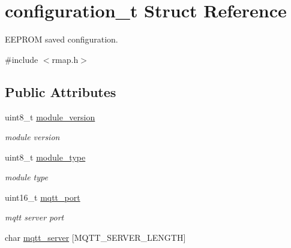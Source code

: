\hypertarget{structconfiguration__t}{}\section{configuration\+\_\+t Struct Reference}
\label{structconfiguration__t}


E\+E\+P\+R\+OM saved configuration.  




{\ttfamily \#include $<$rmap.\+h$>$}

\subsection*{Public Attributes}
\begin{DoxyCompactItemize}
\item 
\mbox{\label{structconfiguration__t_a32d4c4bb78b5b231704c8a9f8d1b9e87}} 
uint8\+\_\+t \hyperlink{structconfiguration__t_a32d4c4bb78b5b231704c8a9f8d1b9e87}{module\+\_\+version}
\begin{DoxyCompactList}\small\item\em module version \end{DoxyCompactList}\item 
\mbox{\label{structconfiguration__t_a7dab895a0a9aa44bb65d90ef8016127d}} 
uint8\+\_\+t \hyperlink{structconfiguration__t_a7dab895a0a9aa44bb65d90ef8016127d}{module\+\_\+type}
\begin{DoxyCompactList}\small\item\em module type \end{DoxyCompactList}\item 
\mbox{\label{structconfiguration__t_aa003a99852a65bd2f9de0d230568bbbf}} 
uint16\+\_\+t \hyperlink{structconfiguration__t_aa003a99852a65bd2f9de0d230568bbbf}{mqtt\+\_\+port}
\begin{DoxyCompactList}\small\item\em mqtt server port \end{DoxyCompactList}\item 
\mbox{\label{structconfiguration__t_ad9a71a593cd2191ed132f9a2d6c00679}} 
char \hyperlink{structconfiguration__t_ad9a71a593cd2191ed132f9a2d6c00679}{mqtt\+\_\+server} \mbox{[}M\+Q\+T\+T\+\_\+\+S\+E\+R\+V\+E\+R\+\_\+\+L\+E\+N\+G\+TH\mbox{]}

\end{DoxyCompactItemize}
